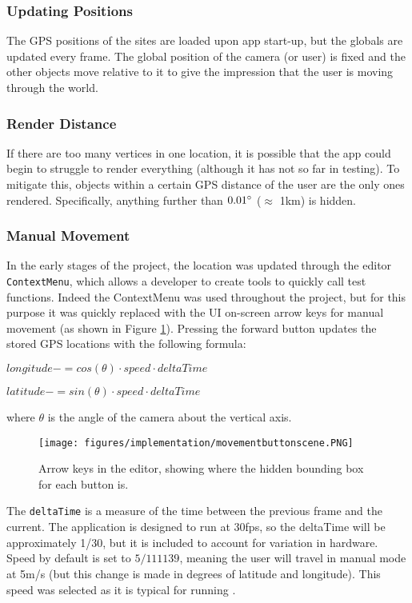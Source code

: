 \documentclass{article}
\begin{document}
\subsubsection{Updating Positions}
The GPS positions of the sites are loaded upon app start-up, but the globals are updated every frame. The global position of the camera (or user) is fixed and the other objects move relative to it to give the impression that the user is moving through the world. 

\subsubsection{Render Distance}
If there are too many vertices in one location, it is possible that the app could begin to struggle to render everything (although it has not so far in testing). To mitigate this, objects within a certain GPS distance of the user are the only ones rendered. Specifically, anything further than $0.01\degree$ ($\approx$ 1km) is hidden.

\subsubsection{Manual Movement}
\label{manualmovement}
In the early stages of the project, the location was updated through the editor \verb|ContextMenu|, which allows a developer to create tools to quickly call test functions. Indeed the ContextMenu was used throughout the project, but for this purpose it was quickly replaced with the UI on-screen arrow keys for manual movement (as shown in Figure \ref{fig:manualmovement}). Pressing the forward button updates the stored GPS locations with the following formula:

\hspace{1cm} $longitude -= cos(\theta) \cdot speed \cdot deltaTime$

\hspace{1cm} $latitude -= sin(\theta) \cdot speed \cdot deltaTime$

where $\theta$ is the angle of the camera about the vertical axis.

\begin{figure}[]
    \centering
    \texttt{[image: figures/implementation/movementbuttonscene.PNG]}
        \caption{Arrow keys in the editor, showing where the hidden bounding box for each button is.}
        \label{fig:manualmovement}
\end{figure}

The \verb|deltaTime| is a measure of the time between the previous frame and the current. The application is designed to run at 30fps, so the deltaTime will be approximately 1/30, but it is included to account for variation in hardware. Speed by default is set to $5/111139$, meaning the user will travel in manual mode at 5m/s (but this change is made in degrees of latitude and longitude). This speed was selected as it is typical for running \cite{movement:runningspeed}.
\end{document}
